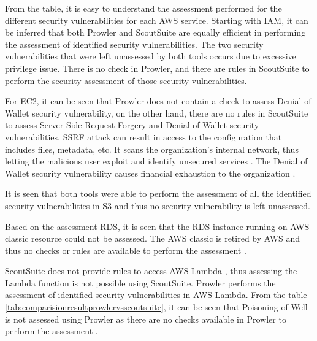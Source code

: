 \par From the table, it is easy to understand the assessment performed for the different security vulnerabilities for each AWS service.
Starting with IAM, it can be inferred that both Prowler and ScoutSuite are equally efficient in performing the assessment of identified security vulnerabilities.
The two security vulnerabilities that were left unassessed by both tools occurs due to excessive privilege issue.
There is no check in Prowler, and there are rules in ScoutSuite to perform the security assessment of those security vulnerabilities.

\par For EC2, it can be seen that Prowler does not
contain a check to assess Denial of Wallet security
vulnerability, on the other hand, there are no rules in
ScoutSuite to assess Server-Side Request Forgery and
Denial of Wallet security vulnerabilities. SSRF attack
can result in access to the configuration that includes
files, metadata, etc.
It scans the organization’s internal network, thus letting the malicious user exploit and identify unsecured services \cite{100}. The Denial of Wallet security vulnerability causes financial exhaustion to the organization \cite{101}.

\par It is seen that both tools were able to perform the assessment of all the identified security vulnerabilities in S3 and thus no security vulnerability is left unassessed.

\par Based on the assessment RDS, it is seen that the RDS instance running on AWS classic resource could not be assessed.
The AWS classic is retired by AWS and thus no checks or
rules are available to perform the assessment \cite{99}.


\par ScoutSuite does not provide rules to access AWS
Lambda \cite{86}, thus assessing the Lambda function is
not possible using ScoutSuite.
Prowler performs the assessment of identified security vulnerabilities in AWS Lambda.
From the table
\ref{tab:comparisionresultprowlervsscoutsuite}, it can be
seen that Poisoning of Well is not assessed using Prowler
as there are no checks available in Prowler to perform
the assessment \cite{102}.